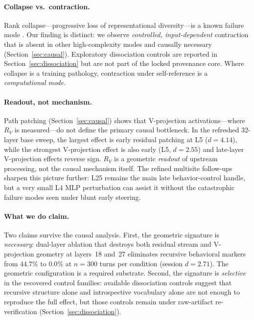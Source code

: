 \documentclass{article}
\newcommand{\RV}{R_V}
\newcommand{\dcohen}{d}
\begin{document}
\paragraph{Collapse vs.\ contraction.}
Rank collapse---progressive loss of representational diversity---is a known failure mode
\citep{noci2022signal, dong2021attention, hong2024variance, giorlandino2025two}.
Our finding is distinct: we observe \emph{controlled, input-dependent} contraction that is
absent in other high-complexity modes and causally necessary (Section~\ref{sec:causal}).
Exploratory dissociation controls are reported in Section~\ref{sec:dissociation} but are not part
of the locked provenance core.
Where collapse is a training pathology, contraction under self-reference is a
\emph{computational mode}.

\paragraph{Readout, not mechanism.}
Path patching (Section~\ref{sec:causal}) shows that V-projection activations---where
$\RV$ is measured---do not define the primary causal bottleneck.
In the refreshed 32-layer base sweep, the largest effect is early residual patching at L5
($\dcohen = 4.14$), while the strongest V-projection effect is also early (L5, $\dcohen = 2.55$)
and late-layer V-projection effects reverse sign.
$\RV$ is a geometric \emph{readout} of upstream processing, not the causal mechanism itself.
The refined multisite follow-ups sharpen this picture further: L25 remains the main late
behavior-control handle, but a very small L4 MLP perturbation can assist it without the
catastrophic failure modes seen under blunt early steering.

\paragraph{What we do claim.}
Two claims survive the causal analysis.
First, the geometric signature is \emph{necessary}: dual-layer ablation that destroys both residual
stream and V-projection geometry at layers~18 and~27 eliminates recursive behavioral markers
from $44.7\%$ to $0.0\%$ at $n{=}300$ turns per condition (session $\dcohen = 2.71$).
The geometric configuration is a required substrate.
Second, the signature is \emph{selective} in the recovered control families: available dissociation
controls suggest that recursive structure alone and introspective vocabulary alone are not enough to
reproduce the full effect, but those controls remain under raw-artifact re-verification
(Section~\ref{sec:dissociation}).
\end{document}
